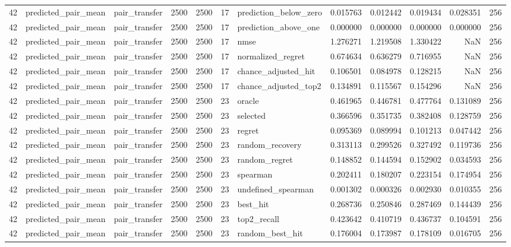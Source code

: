 \begin{tabular}{rllrrrlrrrrr}
42 & predicted_pair_mean & pair_transfer & 2500 & 2500 & 17 & prediction_below_zero & 0.015763 & 0.012442 & 0.019434 & 0.028351 & 256 \\
42 & predicted_pair_mean & pair_transfer & 2500 & 2500 & 17 & prediction_above_one & 0.000000 & 0.000000 & 0.000000 & 0.000000 & 256 \\
42 & predicted_pair_mean & pair_transfer & 2500 & 2500 & 17 & nmse & 1.276271 & 1.219508 & 1.330422 & NaN & 256 \\
42 & predicted_pair_mean & pair_transfer & 2500 & 2500 & 17 & normalized_regret & 0.674634 & 0.636279 & 0.716955 & NaN & 256 \\
42 & predicted_pair_mean & pair_transfer & 2500 & 2500 & 17 & chance_adjusted_hit & 0.106501 & 0.084978 & 0.128215 & NaN & 256 \\
42 & predicted_pair_mean & pair_transfer & 2500 & 2500 & 17 & chance_adjusted_top2 & 0.134891 & 0.115567 & 0.154296 & NaN & 256 \\
42 & predicted_pair_mean & pair_transfer & 2500 & 2500 & 23 & oracle & 0.461965 & 0.446781 & 0.477764 & 0.131089 & 256 \\
42 & predicted_pair_mean & pair_transfer & 2500 & 2500 & 23 & selected & 0.366596 & 0.351735 & 0.382408 & 0.128759 & 256 \\
42 & predicted_pair_mean & pair_transfer & 2500 & 2500 & 23 & regret & 0.095369 & 0.089994 & 0.101213 & 0.047442 & 256 \\
42 & predicted_pair_mean & pair_transfer & 2500 & 2500 & 23 & random_recovery & 0.313113 & 0.299526 & 0.327492 & 0.119736 & 256 \\
42 & predicted_pair_mean & pair_transfer & 2500 & 2500 & 23 & random_regret & 0.148852 & 0.144594 & 0.152902 & 0.034593 & 256 \\
42 & predicted_pair_mean & pair_transfer & 2500 & 2500 & 23 & spearman & 0.202411 & 0.180207 & 0.223154 & 0.174954 & 256 \\
42 & predicted_pair_mean & pair_transfer & 2500 & 2500 & 23 & undefined_spearman & 0.001302 & 0.000326 & 0.002930 & 0.010355 & 256 \\
42 & predicted_pair_mean & pair_transfer & 2500 & 2500 & 23 & best_hit & 0.268736 & 0.250846 & 0.287469 & 0.144439 & 256 \\
42 & predicted_pair_mean & pair_transfer & 2500 & 2500 & 23 & top2_recall & 0.423642 & 0.410719 & 0.436737 & 0.104591 & 256 \\
42 & predicted_pair_mean & pair_transfer & 2500 & 2500 & 23 & random_best_hit & 0.176004 & 0.173987 & 0.178109 & 0.016705 & 256 \\

\end{tabular}
